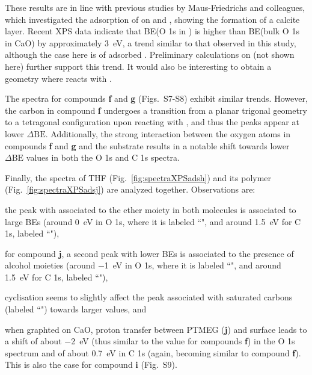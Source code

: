 \documentclass[journal=jpccck,manuscript=article]{achemso}
\def\dbe{\ensuremath{\Delta\text{BE}}}
\begin{document}

These results are in line with previous studies by Maus-Friedrichs and colleagues\cite{ochsCO2ChemisorptionCa1998,voigtsAdsorptionCO2CO2009,dahleSituPreparationCalcium2012}, which investigated the adsorption of  on  and , showing the formation of a calcite layer. Recent XPS data\cite{dahleSituPreparationCalcium2012} indicate that BE(O 1s in ) is higher than BE(bulk O 1s in CaO) by approximately \SI{3}{\electronvolt}, a trend similar to that observed in this study, although the case here is of adsorbed . Preliminary calculations on  (not shown here) further support this trend. It would also be interesting to obtain a geometry where  reacts with .

The spectra for compounds \textbf{f} and \textbf{g} (Figs.~S7-S8) exhibit similar trends. However, the carbon in compound \textbf{f} undergoes a transition from a planar trigonal geometry to a tetragonal configuration upon reacting with , and thus the peaks appear at lower \dbe{}. Additionally, the strong interaction between the oxygen atoms in compounds \textbf{f} and \textbf{g} and the  substrate results in a notable shift towards lower \dbe{} values in both the O 1s and C 1s spectra.

Finally, the spectra of THF (Fig.~\ref{fig:spectraXPSadsh}) and its polymer (Fig.~\ref{fig:spectraXPSadsj}) are analyzed together. Observations are: \begin{inparaenum}[(i)]
	\item the peak with associated to the ether moiety in both molecules is associated to large BEs (around \SI{0}{\electronvolt} in O 1s, where it is labeled ``", and around \SI{1.5}{\electronvolt} for C 1s, labeled ``"), 
	\item for compound \textbf{j}, a second peak with lower BEs is associated to the presence of alcohol moieties (around \SI{-1}{\electronvolt} in O 1s, where it is labeled ``", and around \SI{1.5}{\electronvolt} for C 1s, labeled ``"), 
	\item cyclisation seems to slightly affect the peak associated with saturated carbons (labeled ``") towards larger values, and
	\item when graphted on CaO, proton transfer between PTMEG (\textbf{j}) and surface leads to a shift of about \SI{-2}{\electronvolt}  (thus similar to the value for compounds \textbf{f}) in the O 1s spectrum and of about \SI{0.7}{\electronvolt} in C 1s (again, becoming similar to compound \textbf{f}). This is also the case for compound \textbf{i} (Fig.~S9).
\end{inparaenum}
\end{document}
